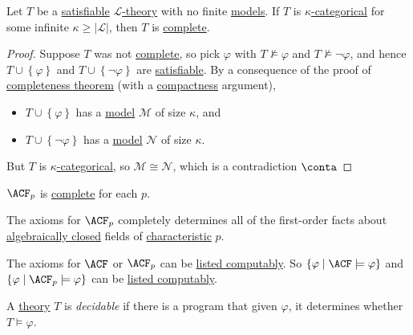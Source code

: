 \begin{theorem}\label{thm:Vaught-test}
	Let \(T\) be a \hyperref[def:satisfiable]{satisfiable} \hyperref[def:theory]{\(\mathcal{L} \)-theory} with no finite \hyperref[def:model]{models}. If \(T\) is \hyperref[def:categorical]{\(\kappa \)-categorical} for some infinite \(\kappa \geq \vert \mathcal{L}  \vert \), then \(T\) is \hyperref[def:theory-complete]{complete}.
\end{theorem}
\begin{proof}
	Suppose \(T\) was not \hyperref[def:theory-complete]{complete}, so pick \(\varphi \) with \(T \not \models \varphi \) and \(T \not \models \lnot \varphi \), and hence \(T \cup \left\{ \varphi  \right\} \) and \(T \cup \left\{ \lnot \varphi  \right\} \) are \hyperref[def:satisfiable]{satisfiable}. By a consequence of the proof of \hyperref[thm:completeness]{completeness theorem} (with a \hyperref[thm:compactness]{compactness} argument),
	\begin{itemize}
		\item \(T \cup \left\{ \varphi  \right\} \) has a \hyperref[def:model]{model} \(\mathcal{M} \) of size \(\kappa \), and
		\item \(T \cup \left\{ \lnot \varphi  \right\} \) has a \hyperref[def:model]{model} \(\mathcal{N} \) of size \(\kappa \).
	\end{itemize}
	But \(T\) is \hyperref[def:categorical]{\(\kappa \)-categorical}, so \(\mathcal{M} \cong \mathcal{N} \), which is a contradiction \(\conta\)
\end{proof}

\begin{corollary}
	\(\ACF_p\) is \hyperref[def:theory-complete]{complete} for each \(p\).
\end{corollary}

The axioms for \(\ACF_p \) completely determines all of the first-order facts about \hyperref[def:algebraically-closed]{algebraically closed} fields of \hyperref[def:characteristic]{characteristic} \(p\).

\begin{remark}[Fact]
	The axioms for \(\ACF \) or \(\ACF_p \) can be \hyperref[def:computably-enumerable]{listed computably}. So \(\left\{ \varphi \mid \ACF \models \varphi \right\} \) and \(\left\{ \varphi \mid \ACF_p \models \varphi \right\} \) can be \hyperref[def:computably-enumerable]{listed computably}.
\end{remark}

\begin{definition}[Decidable]\label{def:decidable}
	A \hyperref[def:theory]{theory} \(T\) is \emph{decidable} if there is a program that given \(\varphi \), it determines whether \(T \models \varphi \).
\end{definition}

